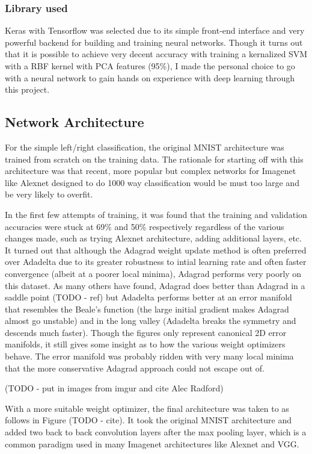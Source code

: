 \documentclass{article}
\begin{document}
\subsubsection{Library used}
Keras with Tensorflow was selected due to its simple front-end interface and very powerful backend for building and training neural networks. Though it turns out that it is possible to achieve very decent accuracy with training a kernalized SVM with a RBF kernel with PCA features (95\%), I made the personal choice to go with a neural network to gain hands on experience with deep learning through this project.

\subsection{Network Architecture}
For the simple left/right classification, the original MNIST architecture was trained from scratch on the training data. The rationale for starting off with this architecture was that recent, more popular but complex networks for Imagenet like Alexnet designed to do 1000 way classification would be must too large and be very likely to overfit.

In the first few attempts of training, it was found that the training and validation accuracies were stuck at 69\% and 50\% respectively regardless of the various changes made, such as trying Alexnet architecture, adding additional layers, etc. It turned out that although the Adagrad weight update method is often preferred over Adadelta due to its greater robustness to intial learning rate and often faster convergence (albeit at a poorer local minima), Adagrad performs very poorly on this dataset. As many others have found, Adagrad does better than Adagrad in a saddle point (TODO - ref) but Adadelta performs better at an error manifold that resembles the Beale's function (the large initial gradient makes Adagrad almost go unstable) and in the long valley (Adadelta breaks the symmetry and descends much faster). Though the figures only represent canonical 2D error manifolds, it still gives some insight as to how the various weight optimizers behave. The error manifold was probably ridden with very many local minima that the more conservative Adagrad approach could not escape out of. 

(TODO - put in images from imgur and cite Alec Radford)

With a more suitable weight optimizer, the final architecture was taken to as follows in Figure (TODO - cite). It took the original MNIST architecture and added two back to back convolution layers after the max pooling layer, which is a common paradigm used in many Imagenet architectures like Alexnet and VGG.
\end{document}
